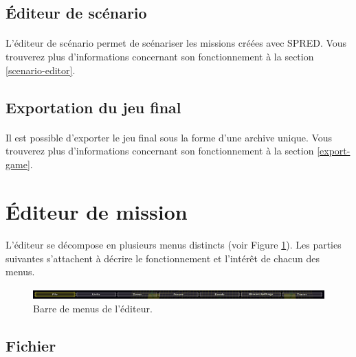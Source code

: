 \documentclass[a4paper]{article}
\begin{document}
\subsection{Éditeur de scénario}
\paragraph{ }
L'éditeur de scénario permet de scénariser les missions créées avec SPRED. Vous trouverez plus d'informations concernant son fonctionnement à la section \ref{scenario-editor}.
\subsection{Exportation du jeu final}
\paragraph{ }
Il est possible d'exporter le jeu final sous la forme d'une archive unique. Vous trouverez plus d'informations concernant son fonctionnement à la section \ref{export-game}.
\section{Éditeur de mission}\label{editor}
\paragraph{ }
L'éditeur se décompose en plusieurs menus distincts (voir Figure \ref{fig:editor-topbar}). Les parties suivantes s'attachent à décrire le fonctionnement et l'intérêt de chacun des menus.
\begin{figure}[H]
\centering
\includegraphics[width=\linewidth]{editor-topbar.png}
\caption{Barre de menus de l'éditeur.}
\label{fig:editor-topbar}
\end{figure}
\subsection{Fichier}
\end{document}
